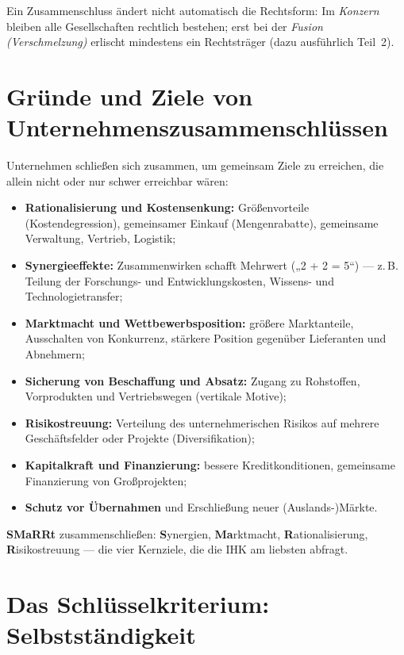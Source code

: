 \documentclass[11pt, a4paper]{article}
\begin{document}
\begin{merksatz}
Ein Zusammenschluss ändert nicht automatisch die Rechtsform: Im \emph{Konzern} bleiben
alle Gesellschaften rechtlich bestehen; erst bei der \emph{Fusion (Verschmelzung)}
erlischt mindestens ein Rechtsträger (dazu ausführlich Teil~2).
\end{merksatz}

\section{Gründe und Ziele von Unternehmenszusammenschlüssen}

Unternehmen schließen sich zusammen, um gemeinsam Ziele zu erreichen, die allein nicht
oder nur schwer erreichbar wären:

\begin{itemize}
  \item \textbf{Rationalisierung und Kostensenkung:} Größenvorteile (Kostendegression),
    gemeinsamer Einkauf (Mengenrabatte), gemeinsame Verwaltung, Vertrieb, Logistik;
  \item \textbf{Synergieeffekte:} Zusammenwirken schafft Mehrwert („2 + 2 = 5``) ---
    z.\,B. Teilung der Forschungs- und Entwicklungskosten, Wissens- und
    Technologietransfer;
  \item \textbf{Marktmacht und Wettbewerbsposition:} größere Marktanteile, Ausschalten
    von Konkurrenz, stärkere Position gegenüber Lieferanten und Abnehmern;
  \item \textbf{Sicherung von Beschaffung und Absatz:} Zugang zu Rohstoffen,
    Vorprodukten und Vertriebswegen (vertikale Motive);
  \item \textbf{Risikostreuung:} Verteilung des unternehmerischen Risikos auf mehrere
    Geschäftsfelder oder Projekte (Diversifikation);
  \item \textbf{Kapitalkraft und Finanzierung:} bessere Kreditkonditionen, gemeinsame
    Finanzierung von Großprojekten;
  \item \textbf{Schutz vor Übernahmen} und Erschließung neuer (Auslands-)Märkte.
\end{itemize}

\begin{eselsbruecke}
\textbf{SMaRRt} zusammenschließen: \textbf{S}ynergien, \textbf{Ma}rktmacht,
\textbf{R}ationalisierung, \textbf{R}isikostreuung --- die vier Kernziele, die die IHK
am liebsten abfragt.
\end{eselsbruecke}

\section{Das Schlüsselkriterium: Selbstständigkeit}
\end{document}
